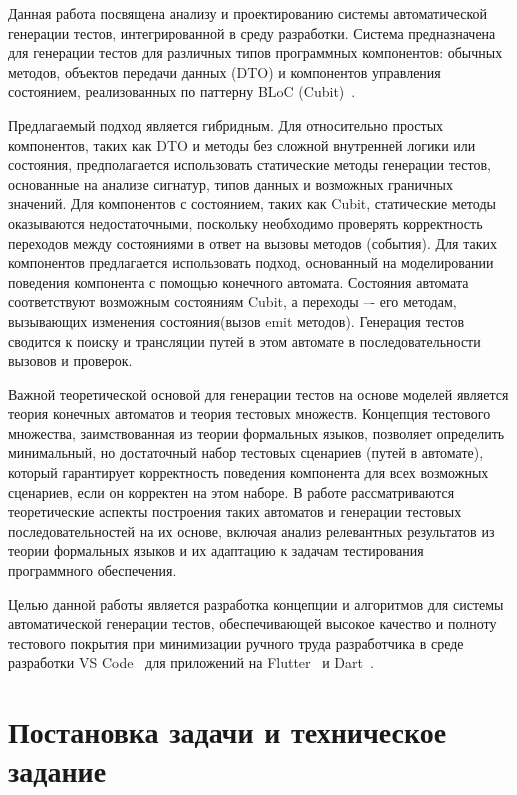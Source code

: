 \documentclass[14pt, russian]{scrartcl}
\begin{document}
Данная работа посвящена анализу и проектированию системы автоматической генерации тестов, интегрированной в среду разработки. Система предназначена для генерации тестов для различных типов программных компонентов: обычных методов, объектов передачи данных (DTO) и компонентов управления состоянием, реализованных по паттерну BLoC (Cubit)~\cite{BlocLibraryTesting}.

Предлагаемый подход является гибридным. Для относительно простых компонентов, таких как DTO и методы без сложной внутренней логики или состояния, предполагается использовать статические методы генерации тестов, основанные на анализе сигнатур, типов данных и возможных граничных значений. Для компонентов с состоянием, таких как Cubit, статические методы оказываются недостаточными, поскольку необходимо проверять корректность переходов между состояниями в ответ на вызовы методов (события). Для таких компонентов предлагается использовать подход, основанный на моделировании поведения компонента с помощью конечного автомата. Состояния автомата соответствуют возможным состояниям Cubit, а переходы –- его методам, вызывающих изменения состояния(вызов emit методов). Генерация тестов сводится к поиску и трансляции путей в этом автомате в последовательности вызовов и проверок.

Важной теоретической основой для генерации тестов на основе моделей является теория конечных автоматов и теория тестовых множеств. Концепция тестового множества, заимствованная из теории формальных языков, позволяет определить минимальный, но достаточный набор тестовых сценариев (путей в автомате), который гарантирует корректность поведения компонента для всех возможных сценариев, если он корректен на этом наборе. В работе рассматриваются теоретические аспекты построения таких автоматов и генерации тестовых последовательностей на их основе, включая анализ релевантных результатов из теории формальных языков и их адаптацию к задачам тестирования программного обеспечения.

Целью данной работы является разработка концепции и алгоритмов для системы автоматической генерации тестов, обеспечивающей высокое качество и полноту тестового покрытия при минимизации ручного труда разработчика в среде разработки VS Code~\cite{VSCodeAPI} для приложений на Flutter~\cite{FlutterDev} и Dart~\cite{DartDev}.

\section{Постановка задачи и техническое задание}
\end{document}
